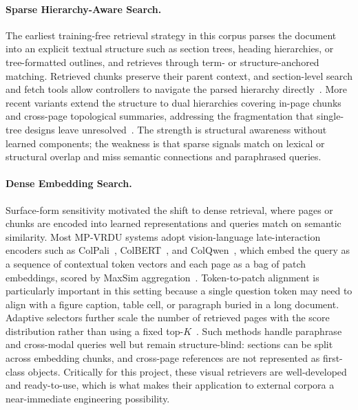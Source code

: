 \documentclass[11pt]{article}
\begin{document}
\paragraph{Sparse Hierarchy-Aware Search.}
The earliest training-free retrieval strategy in this corpus parses the document into an explicit textual structure such as section trees, heading hierarchies, or tree-formatted outlines, and retrieves through term- or structure-anchored matching. Retrieved chunks preserve their parent context, and section-level search and fetch tools allow controllers to navigate the parsed hierarchy directly~\cite{shin2025multidocfusion,sun2025docagent}. More recent variants extend the structure to dual hierarchies covering in-page chunks and cross-page topological summaries, addressing the fragmentation that single-tree designs leave unresolved~\cite{gong2025mhier}. The strength is structural awareness without learned components; the weakness is that sparse signals match on lexical or structural overlap and miss semantic connections and paraphrased queries.

\paragraph{Dense Embedding Search.}
Surface-form sensitivity motivated the shift to dense retrieval, where pages or chunks are encoded into learned representations and queries match on semantic similarity. Most MP-VRDU systems adopt vision-language late-interaction encoders such as ColPali~\cite{faysse2024colpali}, ColBERT~\cite{khattab2020colbert}, and ColQwen~\cite{faysse2025colqwen}, which embed the query as a sequence of contextual token vectors and each page as a bag of patch embeddings, scored by MaxSim aggregation~\cite{wu2025docreact,wu2025molorag,han2025mdocagent,jain2025simpledoc,wang2025vidorag,cho2024m3docrag}. Token-to-patch alignment is particularly important in this setting because a single question token may need to align with a figure caption, table cell, or paragraph buried in a long document. Adaptive selectors further scale the number of retrieved pages with the score distribution rather than using a fixed top-$K$~\cite{li2025avir}. Such methods handle paraphrase and cross-modal queries well but remain structure-blind: sections can be split across embedding chunks, and cross-page references are not represented as first-class objects. Critically for this project, these visual retrievers are well-developed and ready-to-use, which is what makes their application to external corpora a near-immediate engineering possibility.
\end{document}
